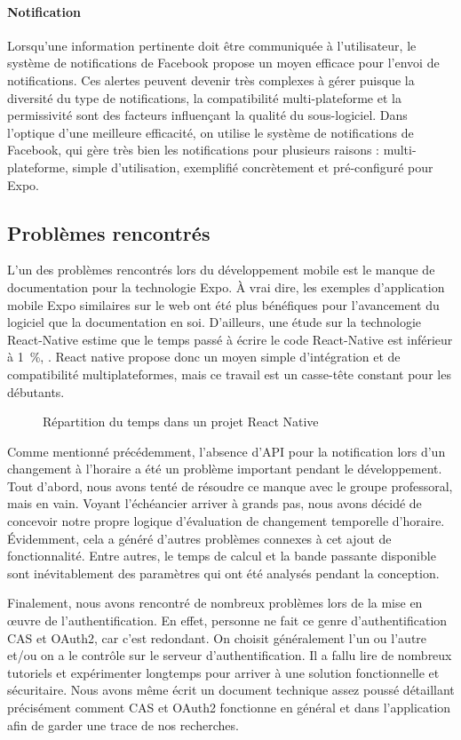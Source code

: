         \paragraph{Notification}
        Lorsqu'une information pertinente doit être communiquée à l'utilisateur, le système de notifications de Facebook propose un moyen efficace pour l'envoi de notifications. Ces alertes peuvent devenir très complexes à gérer puisque la diversité du type de notifications, la compatibilité multi-plateforme et la permissivité sont des facteurs influençant la qualité du sous-logiciel. Dans l'optique d'une meilleure efficacité, on utilise le système de notifications de Facebook, qui gère très bien les notifications pour plusieurs raisons : multi-plateforme, simple d'utilisation, exemplifié concrètement et pré-configuré pour Expo.
    
    \subsection{Problèmes rencontrés}
    L'un des problèmes rencontrés lors du développement mobile est le manque de documentation pour la technologie Expo. À vrai dire, les exemples d'application mobile Expo similaires sur le web ont été plus bénéfiques pour l'avancement du logiciel que la documentation en soi. D'ailleurs, une étude sur la technologie React-Native estime que le temps passé à écrire le code React-Native est inférieur à 1~\%, \cite{react}. React native propose donc un moyen simple d'intégration et de compatibilité multiplateformes, mais ce travail est un casse-tête constant pour les débutants.

    \begin{figure}[hp] \centering
        
        \caption{Répartition du temps dans un projet React Native}
        \label{fig.react}
    \end{figure}
    
    Comme mentionné précédemment, l'absence d'API pour la notification lors d'un changement à l'horaire a été un problème important pendant le développement. Tout d'abord, nous avons tenté de résoudre ce manque avec le groupe professoral, mais en vain. Voyant l'échéancier arriver à grands pas, nous avons décidé de concevoir notre propre logique d'évaluation de changement temporelle d'horaire. Évidemment, cela a généré d'autres problèmes connexes à cet ajout de fonctionnalité. Entre autres, le temps de calcul et la bande passante disponible sont inévitablement des paramètres qui ont été analysés pendant la conception.
    
    Finalement, nous avons rencontré de nombreux problèmes lors de la mise en \oe{}uvre de l'authentification. En effet, personne ne fait ce genre d'authentification CAS et OAuth2, car c'est redondant. On choisit généralement l'un ou l'autre et/ou on a le contrôle sur le serveur d'authentification. Il a fallu lire de nombreux tutoriels et expérimenter longtemps pour arriver à une solution fonctionnelle et sécuritaire. Nous avons même écrit un document technique assez poussé détaillant précisément comment CAS et OAuth2 fonctionne en général et dans l'application afin de garder une trace de nos recherches.
